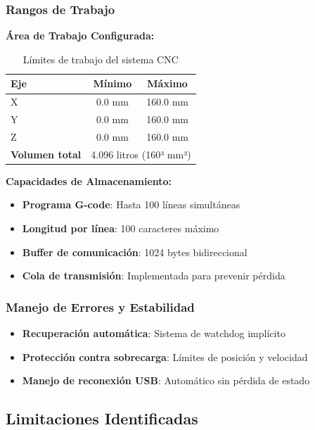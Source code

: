\documentclass[12pt]{article}
\begin{document}
\subsubsection{Rangos de Trabajo}

\textbf{Área de Trabajo Configurada:}
\begin{table}[h]
\centering
\begin{tabular}{|l|c|c|}
\hline
\textbf{Eje} & \textbf{Mínimo} & \textbf{Máximo} \\
\hline
X & 0.0 mm & 160.0 mm \\
Y & 0.0 mm & 160.0 mm \\
Z & 0.0 mm & 160.0 mm \\
\hline
\textbf{Volumen total} & \multicolumn{2}{c|}{4.096 litros (160³ mm³)} \\
\hline
\end{tabular}
\caption{Límites de trabajo del sistema CNC}
\end{table}

\newpage
\textbf{Capacidades de Almacenamiento:}
\begin{itemize}
    \item \textbf{Programa G-code}: Hasta 100 líneas simultáneas
    \item \textbf{Longitud por línea}: 100 caracteres máximo
    \item \textbf{Buffer de comunicación}: 1024 bytes bidireccional
    \item \textbf{Cola de transmisión}: Implementada para prevenir pérdida
\end{itemize}

\subsubsection{Manejo de Errores y Estabilidad}
\begin{itemize}
    \item \textbf{Recuperación automática}: Sistema de watchdog implícito
    \item \textbf{Protección contra sobrecarga}: Límites de posición y velocidad
    \item \textbf{Manejo de reconexión USB}: Automático sin pérdida de estado

\end{itemize}


\subsection{Limitaciones Identificadas}
\end{document}
